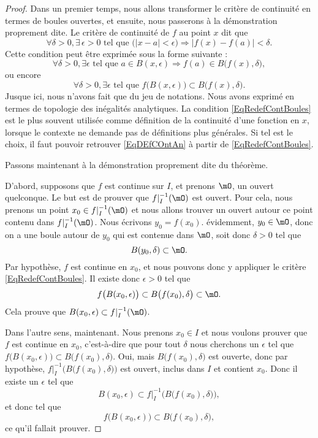 \begin{proof}

	Dans un premier temps, nous allons transformer le critère de continuité en termes de boules ouvertes, et ensuite, nous passerons à la démonstration proprement dite. Le critère de continuité de $f$ au point $x$ dit que
	\begin{equation}        \label{EqDEfCOntAn}
		\forall \delta>0,\exists\,\epsilon>0\text{ tel que }\big( | x-a |< \epsilon \big)\Rightarrow| f(x)-f(a) |<\delta.
	\end{equation}
	Cette condition peut être exprimée sous la forme suivante :
	\[
		\forall \delta>0,\exists\epsilon\text{ tel que } a\in B(x,\epsilon)\Rightarrow f(a)\in B\big( f(x),\delta \big),
	\]
	ou encore
	\begin{equation}        \label{EqRedefContBoules}
		\forall \delta>0,\exists\epsilon\text{ tel que } f\big( B(x,\epsilon) \big)\subset B\big( f(x),\delta \big).
	\end{equation}
	Jusque ici, nous n'avons fait que du jeu de notations. Nous avons exprimé en termes de topologie des inégalités analytiques. La condition \eqref{EqRedefContBoules} est le plus souvent utilisée comme définition de la continuité d'une fonction en \( x\), lorsque le contexte ne demande pas de définitions plus générales. Si tel est le choix, il faut pouvoir retrouver \eqref{EqDEfCOntAn} à partir de \eqref{EqRedefContBoules}.

	Passons maintenant à la démonstration proprement dite du théorème.

	D'abord, supposons que $f$ est continue sur $I$, et prenons $\mO$, un ouvert quelconque. Le but est de prouver que $f|_I^{-1}(\mO)$ est ouvert. Pour cela, nous prenons un point $x_0\in f|_I^{-1}(\mO)$ et nous allons trouver un ouvert autour ce point contenu dans $f|_I^{-1}(\mO)$. Nous écrivons $y_0=f(x_0)$. évidemment, $y_0\in\mO$, donc on a une boule autour de $y_0$ qui est contenue dans $\mO$, soit donc $\delta>0$ tel que
	\[
		B(y_0,\delta)\subset\mO.
	\]
	Par hypothèse, $f$ est continue en $x_0$, et nous pouvons donc y appliquer le critère \eqref{EqRedefContBoules}. Il existe donc $\epsilon>0$ tel que
	\[
		f\big( B(x_0,\epsilon) \big)\subset B\big( f(x_0),\delta \big)\subset\mO.
	\]
	Cela prouve que $B(x_0,\epsilon)\subset f|_I^{-1}(\mO)$.

	Dans l'autre sens, maintenant. Nous prenons $x_0\in I$ et nous voulons prouver que $f$ est continue en $x_0$, c'est-à-dire que pour tout $\delta$ nous cherchons un $\epsilon$ tel que $f\big( B(x_0,\epsilon) \big)\subset B\big( f(x_0),\delta \big)$. Oui, mais $B\big( f(x_0),\delta \big)$ est ouverte, donc par hypothèse, $f|_I^{-1}\Big( B\big( f(x_0),\delta \big) \Big)$ est ouvert, inclus dans $I$ et contient $x_0$. Donc il existe un $\epsilon$ tel que
	\[
		B(x_0,\epsilon)\subset f|_I^{-1}\Big( B\big( f(x_0),\delta \big) \Big),
	\]
	et donc tel que
	\[
		f\big( B(x_0,\epsilon) \big)\subset B\big( f(x_0),\delta \big),
	\]
	ce qu'il fallait prouver.
\end{proof}

